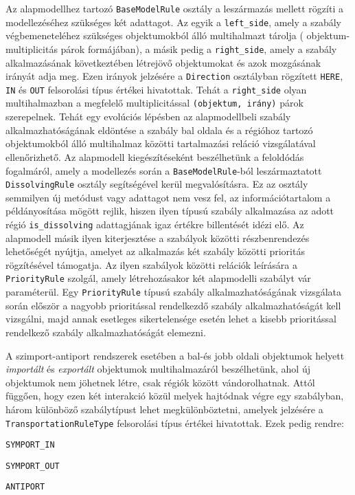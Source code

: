 Az alapmodellhez tartozó \verb|BaseModelRule| osztály a leszármazás mellett rögzíti a modellezéséhez szükséges két adattagot. Az egyik a \verb|left_side|, amely a szabály végbemeneteléhez szükséges objektumokból álló multihalmazt tárolja ( objektum-multiplicitás párok formájában), a másik pedig a \verb|right_side|, amely a szabály alkalmazásának következtében létrejövő objektumokat és azok mozgásának irányát adja meg. Ezen irányok jelzésére a \verb|Direction| osztályban rögzített \verb|HERE|, \verb|IN| és \verb|OUT| felsorolási típus értékei hivatottak. Tehát a \verb|right_side| olyan multihalmazban a megfelelő multiplicitással \verb|(objektum, irány)| párok szerepelnek.
Tehát egy evolúciós lépésben az alapmodellbeli szabály alkalmazhatóságának eldöntése a szabály bal oldala és a régióhoz tartozó objektumokból álló multihalmaz közötti tartalmazási reláció vizsgálatával ellenőrizhető. 
Az alapmodell kiegészítéseként beszélhetünk a feloldódás fogalmáról, amely a modellezés során a \verb|BaseModelRule|-ból leszármaztatott \verb|DissolvingRule| osztály segítségével kerül megvalósításra. Ez az osztály semmilyen új metódust vagy adattagot nem vesz fel, az információtartalom a példányosítása mögött rejlik, hiszen ilyen típusú szabály alkalmazása az adott régió \verb|is_dissolving| adattagjának igaz értékre billentését idézi elő. 
Az alapmodell másik ilyen kiterjesztése a szabályok közötti részbenrendezés lehetőségét nyújtja, amelyet az alkalmazás két szabály közötti prioritás rögzítésével támogatja. Az ilyen szabályok közötti relációk leírására a \verb|PriorityRule| szolgál, amely létrehozásakor két alapmodelli szabályt vár paraméterül.
Egy \verb|PriorityRule| típusú szabály alkalmazhatóságának vizsgálata során először a nagyobb prioritással rendelkezdő szabály alkalmazhatóságát kell vizsgálni, majd annak esetleges  sikertelensége esetén lehet a kisebb prioritással rendelkező szabály alkalmazhatóságát elemezni.

A szimport-antiport rendszerek esetében a bal-és jobb oldali objektumok helyett \textit{importált} és \textit{exportált} objektumok multihalmazáról beszélhetünk, ahol új objektumok nem jöhetnek létre, csak régiók között vándorolhatnak. Attól függően, hogy ezen két interakció közül melyek hajtódnak végre egy szabályban, három különböző szabálytípust lehet megkülönböztetni, amelyek jelzésére a \verb|TransportationRuleType| felsorolási típus értékei hivatottak. Ezek pedig rendre:
\begin{compactenum}
\item \verb|SYMPORT_IN|
\item \verb|SYMPORT_OUT|
\item \verb|ANTIPORT|
\end{compactenum}

